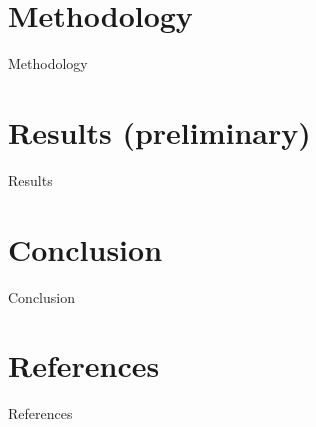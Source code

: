 \documentclass[10pt]{article}
\begin{document}
\section*{Methodology}

Methodology

\section*{Results (preliminary)}

Results

\section*{Conclusion}

Conclusion

\section*{References}

References

% 
% 
\end{document}
